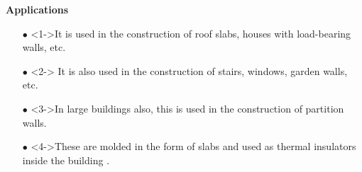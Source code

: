 \documentclass[aspectratio=169]{beamer}
\begin{document}
\begin{frame}{\textbf{Applications }}
      \begin{itemize}
          \large\item[$\bullet$] <1->It is used in the construction of roof slabs, houses with load-bearing walls, etc.
           \vspace{0.5cm}
          \large\item[$\bullet$]<2-> It is also used in the construction of stairs, windows, garden walls, etc.
           \vspace{0.5cm}
          \large\item[$\bullet$] <3->In large buildings also, this is used in the construction of partition walls.
         \vspace{0.5cm}
         \item[$\bullet$]<4->These are molded in the form of slabs and used as thermal insulators
inside the building
  \cite{mohammed2014materials}.
          \end{itemize}
  \end{frame}
\end{document}
